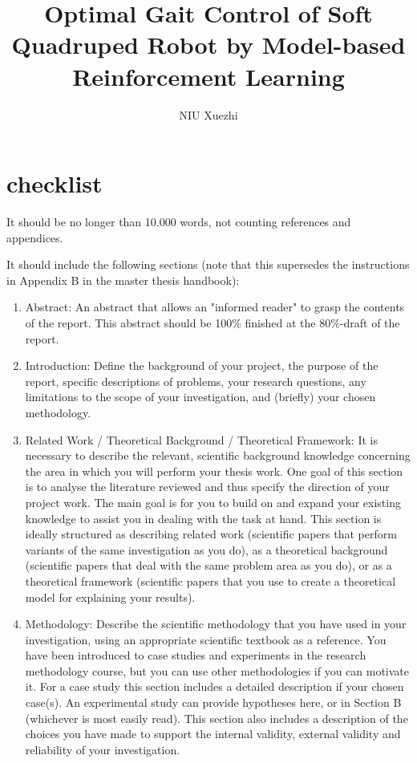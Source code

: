 \documentclass[12pt,openany]{book}
\title{Optimal Gait Control of Soft Quadruped Robot by Model-based Reinforcement Learning}
\author{NIU Xuezhi}
\begin{document}




\section{checklist}
It should be no longer than 10.000 words, not counting references and appendices.
 
It should include the following sections (note that this supersedes the instructions in Appendix B in the master thesis handbook):
 \begin{enumerate}
     \item Abstract: An abstract that allows an "informed reader" to grasp the contents of the report. This abstract should be 100\% finished at the 80\%-draft of the report.
     \item Introduction: Define the background of your project, the purpose of the report, specific descriptions of problems, your research questions, any limitations to the scope of your investigation, and (briefly) your chosen methodology.
     \item Related Work / Theoretical Background / Theoretical Framework: It is necessary to describe the relevant, scientific background knowledge concerning the area in which you will perform your thesis work. One goal of this section is to analyse the literature reviewed and thus specify the direction of your project work. The main goal is for you to build on and expand your existing knowledge to assist you in dealing with the task at hand. This section is ideally structured as describing related work (scientific papers that perform variants of the same investigation as you do), as a theoretical background (scientific papers that deal with the same problem area as you do), or as a theoretical framework (scientific papers that you use to create a theoretical model for explaining your results).
     \item Methodology: Describe the scientific methodology that you have used in your investigation, using an appropriate scientific textbook as a reference. You have been introduced to case studies and experiments in the research methodology course, but you can use other methodologies if you can motivate it. For a case study this section includes a detailed description if your chosen case(s). An experimental study can provide hypotheses here, or in Section B (whichever is most easily read). This section also includes a description of the choices you have made to support the internal validity, external validity and reliability of your investigation.
     

\end{enumerate}
\end{document}
